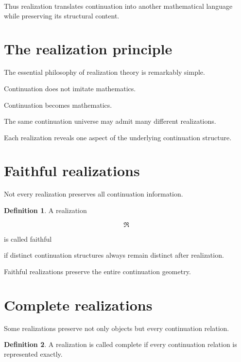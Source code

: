 \documentclass[13pt,openany]{book}
\theoremstyle{plain}
\theoremstyle{definition}
\newtheorem{definition}{Definition}[chapter]
\begin{document}
Thus realization translates continuation into another mathematical language while preserving its structural content.


\section{The realization principle}

The essential philosophy of realization theory is remarkably simple.

Continuation does not imitate mathematics.

Continuation becomes mathematics.

The same continuation universe may admit many different realizations.

Each realization reveals one aspect of the underlying continuation structure.


\section{Faithful realizations}

Not every realization preserves all continuation information.

\begin{definition}

A realization

\[
\mathfrak R
\]

is called faithful

if distinct continuation structures always remain distinct after realization.

\end{definition}

Faithful realizations preserve the entire continuation geometry.


\section{Complete realizations}

Some realizations preserve not only objects but every continuation relation.

\begin{definition}

A realization is called complete if every continuation relation is represented exactly.

\end{definition}
\end{document}
